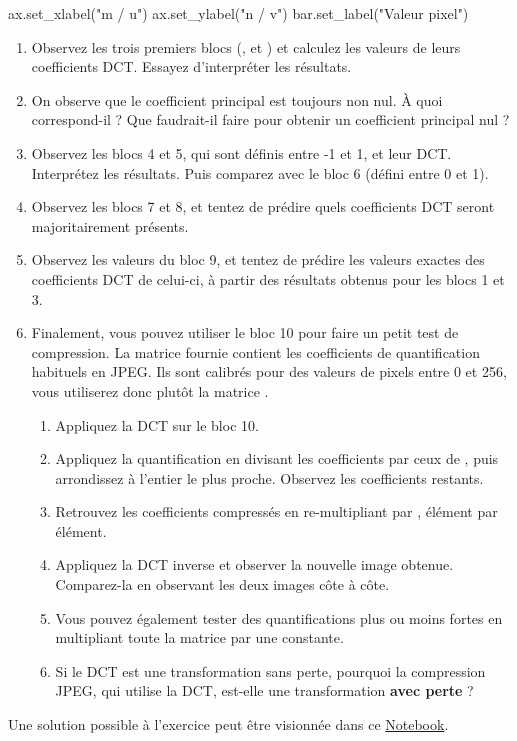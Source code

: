 \documentclass [a4paper, 11pt] {article}
\begin{document}
\begin{exercice}{2}
\begin{python}
    ax.set_xlabel("m / u")
    ax.set_ylabel("n / v")
    bar.set_label("Valeur pixel")
        \end{python}
    
    \begin{enumerate}
        \item Observez les trois premiers blocs (,  et ) et calculez les valeurs de leurs coefficients DCT. Essayez d’interpréter les résultats.
        \item On observe que le coefficient principal est toujours non nul. À quoi correspond-il ? Que faudrait-il faire pour obtenir un coefficient principal nul ?
        \item Observez les blocs 4 et 5, qui sont définis entre -1 et 1, et leur DCT. Interprétez les résultats. Puis comparez avec le bloc 6 (défini entre 0 et 1).
        \item Observez les blocs 7 et 8, et tentez de prédire quels coefficients DCT seront majoritairement présents.
        \item Observez les valeurs du bloc 9, et tentez de prédire les valeurs exactes des coefficients DCT de celui-ci, à partir des résultats obtenus pour les blocs 1 et 3.
        \item Finalement, vous pouvez utiliser le bloc 10 pour faire un petit test de compression. La matrice  fournie contient les coefficients de quantification habituels en JPEG. Ils sont calibrés pour des valeurs de pixels entre 0 et 256, vous utiliserez donc plutôt la matrice .
        \begin{enumerate}
            \item Appliquez la DCT sur le bloc 10.
            \item Appliquez la quantification en divisant les coefficients par ceux de , puis arrondissez à l’entier le plus proche. Observez les coefficients restants.
            \item Retrouvez les coefficients compressés en re-multipliant par , élément par élément.
            \item Appliquez la DCT inverse et observer la nouvelle image obtenue. Comparez-la en observant les deux images côte à côte.
            \item Vous pouvez également tester des quantifications plus ou moins fortes en multipliant toute la matrice  par une constante.
            \item Si le DCT est une transformation sans perte, pourquoi la compression JPEG, qui utilise la DCT, est-elle une transformation \textbf{avec perte} ?
        \end{enumerate}
    \end{enumerate}
    
    \end{exercice}
    
    \begin{reponse}
        Une solution possible à l'exercice peut être visionnée dans ce \href{https://github.com/jeertmans/LELEC1930/blob/main/notebooks/seance4.ipynb}{Notebook}.
    \end{reponse}
\end{document}
